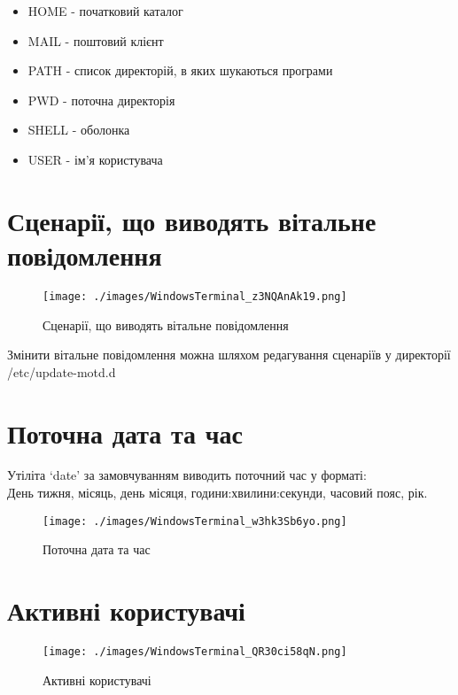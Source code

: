 \begin{itemize}
    \item HOME - початковий каталог
    \item MAIL - поштовий клієнт
    \item PATH - список директорій, в яких шукаються програми
    \item PWD - поточна директорія
    \item SHELL - оболонка
    \item USER - ім'я користувача
\end{itemize}

\section{Сценарії, що виводять вітальне повідомлення}
\label{sec:update_motd}

\begin{figure}[!ht]
    \centering
    \texttt{[image: ./images/WindowsTerminal\_z3NQAnAk19.png]}
    \caption{Сценарії, що виводять вітальне повідомлення}
    \label{fig:update_motd}
\end{figure}

Змінити вітальне повідомлення можна шляхом редагування сценаріїв
у директорії /etc/update-motd.d

\section{Поточна дата та час}
\label{sec:date}

Утіліта `date' за замовчуванням виводить поточний час у форматі: \\
День тижня, місяць, день місяця, години:хвилини:секунди, часовий пояс, рік.

\begin{figure}[!ht]
    \centering
    \texttt{[image: ./images/WindowsTerminal\_w3hk3Sb6yo.png]}
    \caption{Поточна дата та час}
    \label{fig:date}
\end{figure}

\section{Активні користувачі}
\label{sec:users}

\begin{figure}[!ht]
    \centering
    \texttt{[image: ./images/WindowsTerminal\_QR30ci58qN.png]}
    \caption{Активні користувачі}
    \label{fig:users}
\end{figure}

